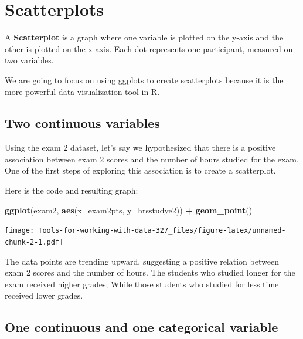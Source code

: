 \documentclass[
]{book}
\newenvironment{Shaded}{\begin{snugshade}}{\end{snugshade}}
\newcommand{\DataTypeTok}[1]{\textcolor[rgb]{0.13,0.29,0.53}{#1}}
\newcommand{\KeywordTok}[1]{\textcolor[rgb]{0.13,0.29,0.53}{\textbf{#1}}}
\newcommand{\NormalTok}[1]{#1}
\newcommand{\OperatorTok}[1]{\textcolor[rgb]{0.81,0.36,0.00}{\textbf{#1}}}
\newcommand{\StringTok}[1]{\textcolor[rgb]{0.31,0.60,0.02}{#1}}
\begin{document}
\hypertarget{scatterplots}{%
\section{Scatterplots}\label{scatterplots}}

A \textbf{Scatterplot} is a graph where one variable is plotted on the y-axis and the other is plotted on the x-axis. Each dot represents one participant, measured on two variables.

We are going to focus on using ggplots to create scatterplots because it is the more powerful data visualization tool in R.

\hypertarget{two-continuous-variables}{%
\subsection{Two continuous variables}\label{two-continuous-variables}}

Using the exam 2 dataset, let's say we hypothesized that there is a positive association between exam 2 scores and the number of hours studied for the exam. One of the first steps of exploring this association is to create a scatterplot.

Here is the code and resulting graph:

\begin{Shaded}
\begin{Highlighting}[]
\KeywordTok{ggplot}\NormalTok{(exam2, }\KeywordTok{aes}\NormalTok{(}\DataTypeTok{x=}\NormalTok{exam2pts, }\DataTypeTok{y=}\NormalTok{hrsstudye2)) }\OperatorTok{+}
\StringTok{  }\KeywordTok{geom_point}\NormalTok{()}
\end{Highlighting}
\end{Shaded}

\texttt{[image: Tools-for-working-with-data-327\_files/figure-latex/unnamed-chunk-2-1.pdf]}

The data points are trending upward, suggesting a positive relation between exam 2 scores and the number of hours. The students who studied longer for the exam received higher grades; While those students who studied for less time received lower grades.

\hypertarget{one-continuous-and-one-categorical-variable}{%
\subsection{One continuous and one categorical variable}\label{one-continuous-and-one-categorical-variable}}
\end{document}
